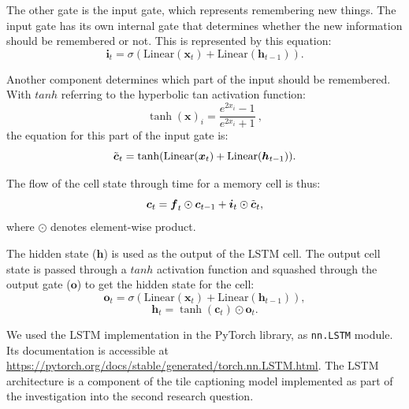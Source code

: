 \documentclass{l4proj}
\begin{document}
The other gate is the input gate, which represents remembering new things. The input gate has its own internal gate that determines whether the new information should be remembered or not. This is represented by this equation:
\begin{equation}
    \boldsymbol{i}_t = \sigma(\text{Linear}(\boldsymbol{x}_t) + \text{Linear}(\boldsymbol{h}_{t-1})).
\end{equation}

Another component determines which part of the input should be remembered. With $tanh$ referring to the hyperbolic tan activation function:
\begin{equation}
    \tanh(\boldsymbol{x})_i = \frac{e^{2x_i} - 1}{e^{2x_i} + 1}\ ,
\end{equation}
the equation for this part of the input gate is:
\begin{equation}
    \Tilde{\boldsymbol{c}}_t = \tanh(\text{Linear}(\boldsymbol{x}_t) + \text{Linear}(\boldsymbol{h}_{t-1})).
\end{equation}

The flow of the cell state through time for a memory cell is thus:
\begin{equation}
    \boldsymbol{c}_t = \boldsymbol{f}_t \odot \boldsymbol{c}_{t-1} + \boldsymbol{i}_t \odot \Tilde{\boldsymbol{c}}_t,
\end{equation}
where $\odot$ denotes element-wise product.

The hidden state ($\boldsymbol{h}$) is used as the output of the LSTM cell. The output cell state is passed through a $tanh$ activation function and squashed through the output gate ($\boldsymbol{o}$) to get the hidden state for the cell:
\begin{equation}
    \boldsymbol{o}_t = \sigma(\text{Linear}(\boldsymbol{x}_t) + \text{Linear}(\boldsymbol{h}_{t-1})),
\end{equation}
\begin{equation}
    \boldsymbol{h}_t = \tanh(\boldsymbol{c}_t) \odot \boldsymbol{o}_t.
\end{equation}

We used the LSTM implementation in the PyTorch library, as \verb|nn.LSTM| module. Its documentation is accessible at \url{https://pytorch.org/docs/stable/generated/torch.nn.LSTM.html}. The LSTM architecture is a component of the tile captioning model implemented as part of the investigation into the second research question. 

\end{document}
